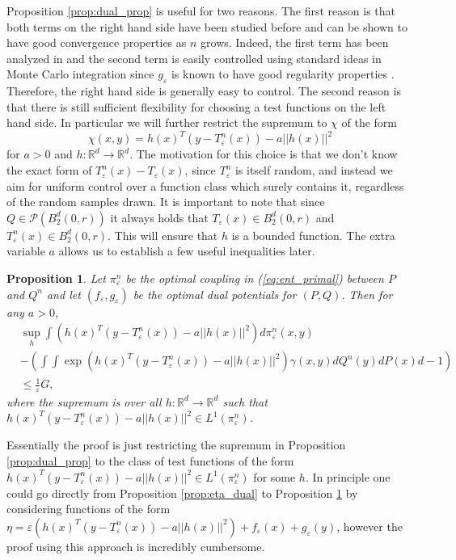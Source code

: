 \documentclass{article}
\newtheorem{proposition}{Proposition}
\theoremstyle{definition}
\newcommand{\feps}{f_\varepsilon}
\newcommand{\geps}{g_\varepsilon}
\newcommand{\Teps}{T_\varepsilon}
\begin{document}
Proposition \ref{prop:dual_prop} is useful for two reasons. The first reason is that both terms on the right hand side have been studied before and can be shown to have good convergence properties as $n$ grows. Indeed, the first term has been analyzed in \cite{pooladian2021entropic} and the second term is easily controlled using standard ideas in Monte Carlo integration since $\geps$ is known to have good regularity properties \cite{genevay2019sample}. Therefore, the right hand side is generally easy to control. The  second reason is that there is still sufficient flexibility for choosing a test functions on the left hand side. In particular we will further restrict the supremum to $\chi$ of the form 
$$\chi(x,y) = h(x)^T(y-\Teps^n(x)) - a||h(x)||^2$$
for $a > 0$ and $h:\mathbb{R}^d \rightarrow \mathbb{R}^d$.  
The motivation for this choice is that we don't know the exact form of $\Teps^n(x) - \Teps(x)$, since $\Teps^n$ is itself random, and instead we aim for uniform control over a function class which surely contains it, regardless of the random samples drawn. It is important to note that since $Q \in\mathcal{P}(B_2^d(0,r))$ it always holds that $\Teps(x) \in B_2^d(0,r)$ and $\Teps^n(x) \in B_2^d(0,r)$. This will ensure that $h$ is a bounded function. The extra variable $a$ allows us to establish a few useful inequalities later.  
\begin{proposition}\label{prop:dual_prop_2}
    Let $\pi_\varepsilon^n$ be the optimal coupling in (\ref{eq:ent_primal}) between $P$ and $Q^n$ and let $(\feps, \geps)$ be the optimal dual potentials for $(P,Q)$. Then for any $a > 0$,
    \begin{align*}
        &\sup_h \int (h(x)^T(y - \Teps^n(x)) - a||h(x)||^2) d\pi_\varepsilon^n(x,y) \nonumber \\
        &- \left (\int\int \exp\left ( h(x)^T(y - \Teps^n(x)) - a||h(x)||^2 \right )\gamma(x,y) dQ^n(y)dP(x)d - 1 \right ) \nonumber \\
        &\leq \frac{1}{\varepsilon}G,
    \end{align*}
    where the supremum is over all $h:\mathbb{R}^d\rightarrow \mathbb{R}^d$ such that $h(x)^T(y - \Teps^n(x)) - a||h(x)||^2 \in L^1(\pi_\varepsilon^n)$.
\end{proposition} 
Essentially the proof is just restricting the supremum in Proposition \ref{prop:dual_prop} to the class of test functions of the form $h(x)^T(y - \Teps^n(x)) - a||h(x)||^2 \in L^1(\pi_\varepsilon^n)$ for some $h$. In principle one could go directly from Proposition \ref{prop:eta_dual} to Proposition \ref{prop:dual_prop_2} by considering functions of the form $\eta = \varepsilon(h(x)^T(y - \Teps^n(x)) - a||h(x)||^2) + \feps(x) + \geps(y)$, however the proof using this approach is incredibly cumbersome.
\end{document}
